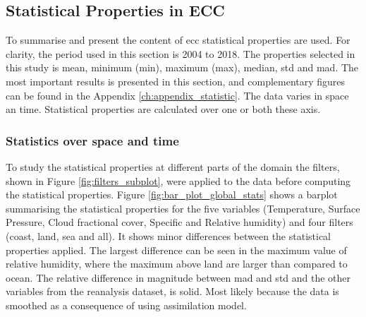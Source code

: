 \subsection{Statistical Properties in ECC}
To summarise and present the content of \acrshort{ecc} statistical properties are used. For clarity, the period used in this section is 2004 to 2018. The properties selected in this study is mean, minimum (min), maximum (max), median, \acrfull{std} and \acrfull{mad}. The most important results is presented in this section, and complementary figures can be found in the Appendix \ref{ch:appendix_statistic}. 
The data varies in space an time. Statistical properties are calculated over one or both these axis.

\subsubsection{Statistics over space and time}
To study the statistical properties at different parts of the domain the filters, shown in Figure \ref{fig:filters_subplot}, were applied to the data before computing the statistical properties. Figure \ref{fig:bar_plot_global_stats} shows a barplot summarising the statistical properties for the five variables (Temperature, Surface Pressure, Cloud fractional cover, Specific and Relative humidity) and four filters (coast, land, sea and all). It shows minor differences between the statistical properties applied. The largest difference can be seen in the maximum value of relative humidity, where the maximum above land are larger than compared to ocean. The relative difference in magnitude between \acrshort{mad} and \acrshort{std} and the other variables from the reanalysis dataset, is solid. Most likely because the data is smoothed as a consequence of using assimilation model. 
